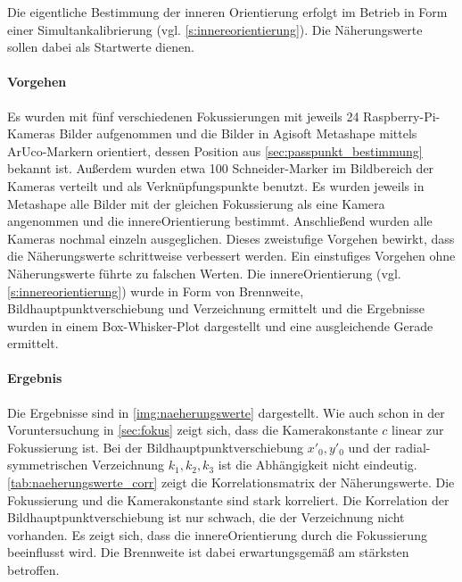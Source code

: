 \documentclass[./00PhotoBox.tex]{subfiles}
\begin{document}
Die eigentliche Bestimmung der inneren Orientierung erfolgt im Betrieb in Form einer Simultankalibrierung (vgl. \autoref{s:innereorientierung}). Die Näherungswerte sollen dabei als Startwerte dienen.

\paragraph{Vorgehen}

Es wurden mit fünf verschiedenen Fokussierungen mit jeweils 24 Rasp\-berry-Pi-Kameras Bilder aufgenommen und die Bilder in Agisoft Metashape mittels ArUco-Markern orientiert, dessen Position aus \autoref{sec:passpunkt_bestimmung} bekannt ist. Außerdem wurden etwa 100 Schneider-Marker im Bildbereich der Kameras verteilt und als Verknüpfungspunkte benutzt. Es wurden jeweils in Metashape alle Bilder mit der gleichen Fokussierung als eine Kamera angenommen und die \gls{innereOrientierung} bestimmt. Anschließend wurden alle Kameras nochmal einzeln ausgeglichen. Dieses zweistufige Vorgehen bewirkt, dass die Näherungswerte schrittweise verbessert werden. Ein einstufiges Vorgehen ohne Näherungswerte führte zu falschen Werten. Die \gls{innereOrientierung} (vgl. \autoref{s:innereorientierung}) wurde in Form von Brennweite, \Gls{Bildhauptpunkt}verschiebung und \Gls{Verzeichnung} ermittelt und die Ergebnisse wurden in einem Box-Whisker-Plot dargestellt und eine ausgleichende Gerade ermittelt.

\paragraph{Ergebnis}

Die Ergebnisse sind in \autoref{img:naeherungswerte} dargestellt. Wie auch schon in der Voruntersuchung in \autoref{sec:fokus} zeigt sich, dass die \Gls{Kamerakonstante} $c$ linear zur Fokussierung ist. Bei der \Gls{Bildhauptpunkt}verschiebung $x'_0, y'_0$ und der radial-symmetrischen \Gls{Verzeichnung} $k_1,k_2,k_3$ ist die Abhängigkeit nicht eindeutig. \autoref{tab:naeherungswerte_corr} zeigt die Korrelationsmatrix der Näherungswerte. Die Fokussierung und die \Gls{Kamerakonstante} sind stark korreliert. Die Korrelation der \Gls{Bildhauptpunkt}verschiebung ist nur schwach, die der \Gls{Verzeichnung} nicht vorhanden. Es zeigt sich, dass die \gls{innereOrientierung} durch die Fokussierung beeinflusst wird. Die \Gls{Brennweite} ist dabei erwartungsgemäß am stärksten betroffen.
\end{document}
